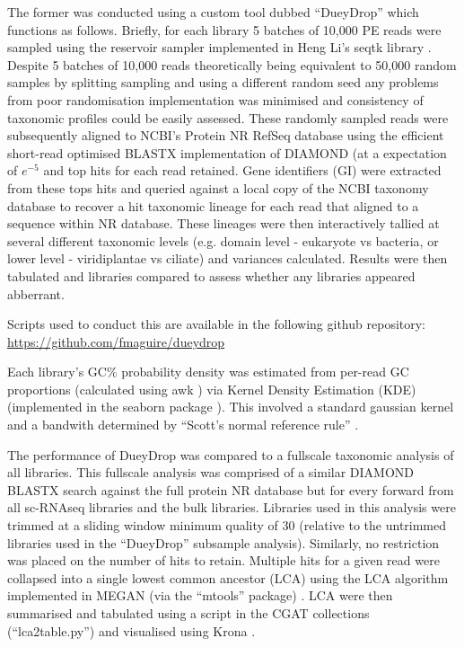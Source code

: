 The former was conducted using a custom tool dubbed ``DueyDrop'' which functions as follows.
Briefly, for each library 5 batches of 10,000 PE reads were sampled 
using the reservoir sampler \citep{Vitter1985} implemented in Heng Li's seqtk library \citep{SeqtkGitHub}.
Despite 5 batches of 10,000 reads theoretically being equivalent to 50,000 random samples by splitting
sampling and using a different random seed any problems from poor randomisation implementation 
was minimised and consistency of taxonomic profiles could be easily assessed.
These randomly sampled reads were subsequently aligned to NCBI's Protein NR RefSeq database \citep{Pruitt2007}
using the efficient short-read optimised BLASTX implementation of DIAMOND \citep{Buchfink2015} (at a expectation
    of \(e^{-5}\) and top hits for each read retained.  Gene identifiers (GI) were extracted from these tops hits and queried against a
local copy of the NCBI taxonomy database \citep{Federhen2012} to recover a hit taxonomic lineage for each
read that aligned to a sequence within NR database. These lineages were then interactively tallied 
at several different taxonomic levels (e.g. domain level - eukaryote vs bacteria, or lower level - viridiplantae vs ciliate) and variances
calculated.  Results were then tabulated and libraries compared to assess whether any libraries appeared
abberrant.

Scripts used to conduct this are available in the following github repository:
\url{https://github.com/fmaguire/dueydrop}

Each library's GC\% probability density was estimated from per-read GC proportions
(calculated using awk \citep{Aho1987}) via Kernel Density Estimation (KDE) \citep{Rosenblatt1956,Parzen1962} 
(implemented in the seaborn package \citep{michael_waskom_2015_19108}).
This involved a standard gaussian kernel and a bandwith determined by ``Scott's normal reference rule'' \citep{Scott1979}.  



The performance of DueyDrop was compared to a fullscale taxonomic analysis of all libraries.
This fullscale analysis was comprised of a similar DIAMOND BLASTX search against the full
protein NR database but for every forward from all sc-RNAseq libraries and the bulk libraries.
Libraries used in this analysis were trimmed at a sliding window minimum quality of 30 (relative to
the untrimmed libraries used in the ``DueyDrop'' subsample analysis). Similarly, no restriction
was placed on the number of hits to retain.  Multiple hits for a given read were collapsed 
into a single lowest common ancestor (LCA) using the LCA algorithm \citep{Gabow1985} implemented in MEGAN (via the ``mtools''
package) \citep{Huson2007,el2013improved}.  LCA were then summarised and tabulated using
a script in the CGAT collections (``lca2table.py'') \citep{Sims2014} and visualised 
using Krona \citep{Ondov2011}.


